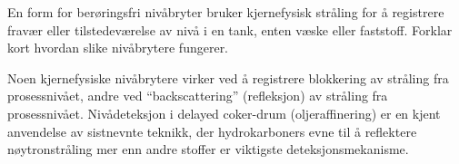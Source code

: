 

En form for berøringsfri nivåbryter bruker kjernefysisk stråling for å registrere fravær eller tilstedeværelse av nivå i en tank, enten væske eller faststoff.  Forklar kort hvordan slike nivåbrytere fungerer.







Noen kjernefysiske nivåbrytere virker ved å registrere blokkering av stråling fra prosessnivået, andre ved ``backscattering'' (refleksjon) av stråling fra prosessnivået.  Nivådeteksjon i delayed coker-drum (oljeraffinering) er en kjent anvendelse av sistnevnte teknikk, der hydrokarboners evne til å reflektere nøytronstråling mer enn andre stoffer er viktigste deteksjonsmekanisme.









